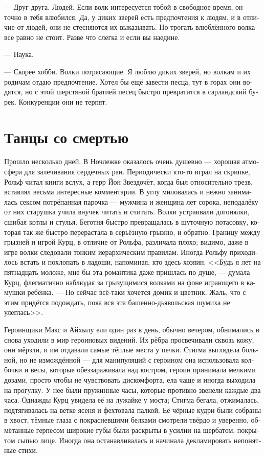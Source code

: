 \documentclass[a4paper,12pt,fleqn]{book}\usepackage{polyglossia}\setdefaultlanguage[babelshorthands=true]{russian}\setotherlanguage{english}\defaultfontfeatures{Ligatures=TeX,Mapping=tex-text}\usepackage{xcolor}\newcommand{\ml}[3]{#2}
\begin{document}
--- Друг друга.
Людей.
Если волк интересуется тобой в свободное время, он точно в тебя влюбился.
Да, у диких зверей есть предпочтения к людям, и в отличие от людей, они не стесняются их выказывать.
Но трогать влюблённого волка все равно не стоит.
Разве что слегка и если вы наедине.

--- Наука.

--- Скорее хобби.
Волки потрясающие.
Я люблю диких зверей, но волкам и их родичам отдаю предпочтение.
\ml{$0$}
{Хотел бы ещё завести песца, тут в горах они водятся, но с этой шерстяной братией песец быстро превратится в сарландский бурек.}
{Also I'd get a snowfox, they kind lives here in the mountains, but with that wool-and-woof brethren a snowfox will be turned into Sarland burek pretty soon.}
\ml{$0$}
{Конкуренции они не терпят.}
{They don't allow no concurrence down here.}

\section{Танцы со смертью}

Прошло несколько дней.
В Ночлежке оказалось очень душевно --- хорошая атмосфера для залечивания сердечных ран.
Периодически кто-то играл на скрипке, Рольф читал книги вслух, а герр Йон Звездочёт, когда был относительно трезв, вставлял весьма интересные комментарии.
В углу миловалась и нежно занималась сексом потрёпанная парочка --- мужчина и женщина лет сорока, неподалёку от них старушка учила внучек читать и считать.
Волки устраивали догонялки, сшибая котлы и стулья.
Беготня быстро превращалась в шуточную потасовку, которая так же быстро перерастала в серьёзную грызню, и обратно.
Границу между грызней и игрой Курц, в отличие от Рольфа, различала плохо;
видимо, даже в игре волки следовали тонким иерархическим правилам.
Иногда Рольфу приходилось встать и похлопать в ладоши, напоминая, кто здесь хозяин.
<<Будь я лет на пятнадцать моложе, мне бы эта романтика даже пришлась по душе, --- думала Курц, флегматично наблюдая за грызущимися волками на фоне играющего в камушки ребёнка.
--- Но сейчас всё-таки хочется домик и цветник.
Жаль, что с этим придётся подождать, пока вся эта башенно-дьявольская шумиха не улеглась>>.

Героинщики Макс и Айхылу ели один раз в день, обычно вечером, обнимались и снова уходили в мир героиновых видений.
Их рёбра просвечивали сквозь кожу, они мёрзли, и им отдавали самые тёплые места у печки.
Стигма выглядела больной, но не измождённой --- для манипуляций с героином она использовала колбочки и весы, которые обеззараживала над костром, героин принимала мелкими дозами, просто чтобы не чувствовать дискомфорта, ела чаще и иногда выходила на прогулку.
У нее были пружинные часы, которые противно звенели каждые два часа.
Однажды Курц увидела её на лужайке у моста;
Стигма бегала, отжималась, подтягивалась на ветке ясеня и фехтовала палкой.
Её чёрные кудри были собраны в хвост, тёмные глаза с покрасневшими белками смотрели твёрдо и уверенно, обмётанные герпесом широкие губы были раскрыты в усилии на щербатом, покрытом сыпью лице.
Иногда она останавливалась и начинала декламировать непонятные стихи.
\end{document}
